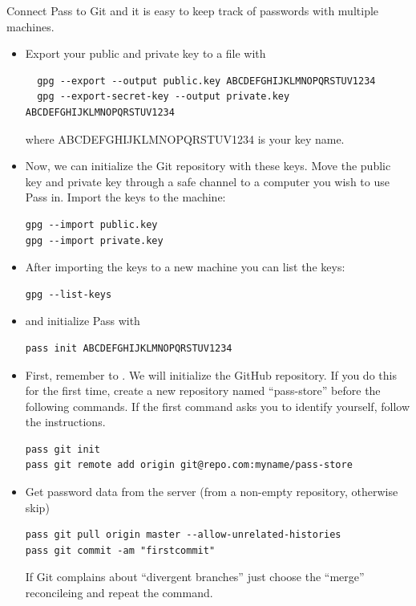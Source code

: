 \documentclass{article}
\begin{document}
Connect Pass to Git and it is easy to keep track of passwords with multiple machines.
\begin{itemize}
\item Export your public and private key to a file with \\
\begin{verbatim}
  gpg --export --output public.key ABCDEFGHIJKLMNOPQRSTUV1234 
  gpg --export-secret-key --output private.key ABCDEFGHIJKLMNOPQRSTUV1234
\end{verbatim}
where ABCDEFGHIJKLMNOPQRSTUV1234 is your key name.\\
\item Now, we can initialize the Git repository with these keys. Move the public key and private key through a safe channel to a computer you wish to use Pass in. Import the keys to the machine: \\
\begin{verbatim}
gpg --import public.key
gpg --import private.key
\end{verbatim}
\item After importing the keys to a new machine you can list the keys:
\begin{verbatim}
gpg --list-keys 
\end{verbatim}
\item and initialize Pass with
\begin{verbatim}
pass init ABCDEFGHIJKLMNOPQRSTUV1234
\end{verbatim}
\item First, remember to . We will initialize the GitHub repository. If you do this for the first time, create a new repository named ``pass-store'' before the following commands. If the first command asks you to identify yourself, follow the instructions.
\begin{verbatim}
pass git init 
pass git remote add origin git@repo.com:myname/pass-store
\end{verbatim}
\item Get password data from the server (from a non-empty repository, otherwise skip)
\begin{verbatim}
pass git pull origin master --allow-unrelated-histories
pass git commit -am "firstcommit"
\end{verbatim}
If Git complains about ``divergent branches'' just choose the ``merge'' reconcileing and repeat the command.

\end{itemize}
\end{document}
